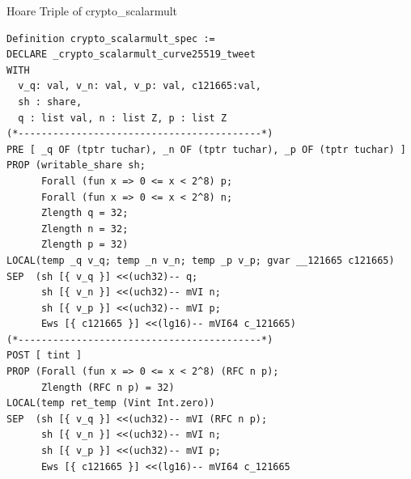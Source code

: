 \documentclass[8pt,aspectratio=169]{beamer}
\begin{document}
%
%





%
%
\begin{frame}[fragile]{Hoare Triple of crypto\_scalarmult}
	\begin{lstlisting}[language=CoqVST]
Definition crypto_scalarmult_spec :=
DECLARE _crypto_scalarmult_curve25519_tweet
WITH
  v_q: val, v_n: val, v_p: val, c121665:val,
  sh : share,
  q : list val, n : list Z, p : list Z
(*------------------------------------------*)
PRE [ _q OF (tptr tuchar), _n OF (tptr tuchar), _p OF (tptr tuchar) ]
PROP (writable_share sh;
      Forall (fun x => 0 <= x < 2^8) p;
      Forall (fun x => 0 <= x < 2^8) n;
      Zlength q = 32;
      Zlength n = 32;
      Zlength p = 32)
LOCAL(temp _q v_q; temp _n v_n; temp _p v_p; gvar __121665 c121665)
SEP  (sh [{ v_q }] <<(uch32)-- q;
      sh [{ v_n }] <<(uch32)-- mVI n;
      sh [{ v_p }] <<(uch32)-- mVI p;
      Ews [{ c121665 }] <<(lg16)-- mVI64 c_121665)
(*------------------------------------------*)
POST [ tint ]
PROP (Forall (fun x => 0 <= x < 2^8) (RFC n p);
      Zlength (RFC n p) = 32)
LOCAL(temp ret_temp (Vint Int.zero))
SEP  (sh [{ v_q }] <<(uch32)-- mVI (RFC n p);
      sh [{ v_n }] <<(uch32)-- mVI n;
      sh [{ v_p }] <<(uch32)-- mVI p;
      Ews [{ c121665 }] <<(lg16)-- mVI64 c_121665
\end{lstlisting}
\end{frame}
\end{document}
